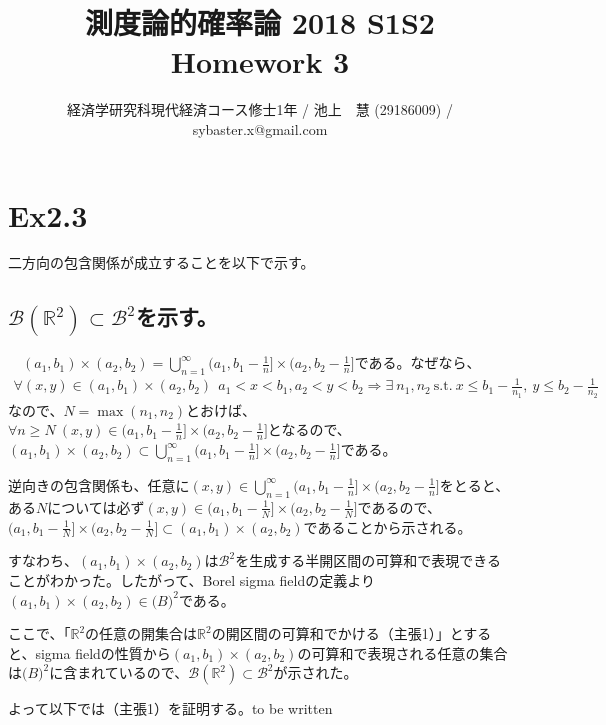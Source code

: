 \documentclass{article}
\begin{document}
\title{測度論的確率論 2018 S1S2 \\ 
Homework 3}
\author{経済学研究科現代経済コース修士1年 / 池上　慧 (29186009) / sybaster.x@gmail.com}
\maketitle

\section{Ex2.3}
二方向の包含関係が成立することを以下で示す。

\subsection{$\mathcal{B}\left( \mathbb{R}^2 \right) \subset \mathcal{B}^2$を示す。}
　$(a_1, b_1)\times (a_2,b_2) = \bigcup_{n=1}^{\infty} (a_1, b_1 -\frac{1}{n}] \times(a_2, b_2-\frac{1}{n}]$である。なぜなら、
\begin{align*}
	\forall (x, y) \in (a_1, b_1)\times (a_2,b_2)\ \ a_1 < x < b_1, a_2 < y<b_2
	\Rightarrow
	\exists\ n_1,n_2\ \text{s.t.}\ x\leq b_1-\frac{1}{n_1},\ y\leq b_2-\frac{1}{n_2}
\end{align*}
なので、$N = \max(n_1, n_2)$とおけば、$\forall n\geq N\ (x,y) \in (a_1, b_1 -\frac{1}{n}] \times(a_2, b_2-\frac{1}{n}]$となるので、$(a_1, b_1)\times (a_2,b_2) \subset \bigcup_{n=1}^{\infty} (a_1, b_1 -\frac{1}{n}] \times(a_2, b_2-\frac{1}{n}]$である。

逆向きの包含関係も、任意に$(x,y)\in \bigcup_{n=1}^{\infty} (a_1, b_1 -\frac{1}{n}] \times(a_2, b_2-\frac{1}{n}]$をとると、ある$N$については必ず$(x, y)\in (a_1, b_1 -\frac{1}{N}] \times(a_2, b_2-\frac{1}{N}]$であるので、$(a_1, b_1 -\frac{1}{N}] \times(a_2, b_2-\frac{1}{N}] \subset (a_1,b_1)\times(a_2,b_2)$であることから示される。

すなわち、$(a_1,b_1)\times(a_2,b_2)$は$\mathcal{B}^2$を生成する半開区間の可算和で表現できることがわかった。したがって、Borel sigma fieldの定義より$(a_1,b_1)\times(a_2,b_2) \in \mathcal(B)^2$である。

ここで、「$\mathbb{R}^2$の任意の開集合は$\mathbb{R}^2$の開区間の可算和でかける（主張1）」とすると、sigma fieldの性質から$(a_1,b_1)\times(a_2,b_2)$の可算和で表現される任意の集合は$\mathcal(B)^2$に含まれているので、$\mathcal{B}\left( \mathbb{R}^2 \right) \subset \mathcal{B}^2$が示された。

よって以下では（主張1）を証明する。to be written
\end{document}
